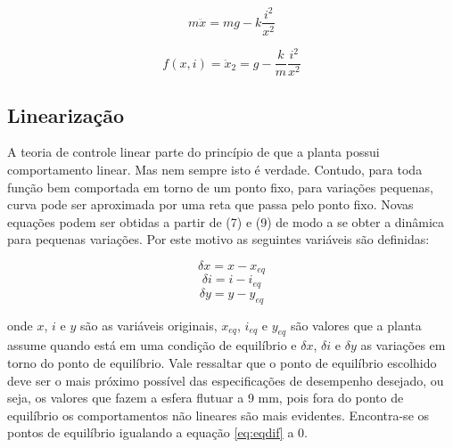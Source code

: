 \documentclass{ifacconf}
\begin{document}
\begin{equation}
    m\ddot{x} = mg - k \frac{i^2}{x^2}
\end{equation}

\begin{equation}
    f(x,i) = \ddot{x}_2 = g - \frac{k}{m} \frac{i^2}{x^2}
    \label{eq:eqdif}
\end{equation}

\subsection{Linearização}

A teoria de controle linear parte do princípio de que a planta
possui comportamento linear. Mas nem sempre isto é
verdade. Contudo, para toda função bem comportada em torno de
um ponto fixo, para variações pequenas, curva pode ser aproximada por uma reta que passa pelo ponto fixo. Novas equações podem ser obtidas a partir de (7) e (9) de modo a se obter a dinâmica para pequenas variações. Por este motivo as seguintes variáveis são definidas:

\begin{equation}
    \delta x = x - x_{eq}
\end{equation}
\begin{equation}
    \delta i = i - i_{eq}
\end{equation}
\begin{equation}
    \delta y = y - y_{eq}
\end{equation}

\noindent onde $x$, $i$ e $y$ são as variáveis originais, $x_{eq}$, $i_{eq}$ e $y_{eq}$ são valores que a planta assume quando está em uma condição de equilíbrio e $\delta x$, $\delta i$ e $\delta y$ as variações em torno do ponto de equilíbrio. Vale ressaltar que o ponto de equilíbrio escolhido deve ser o mais próximo possível das especificações de desempenho desejado, ou seja, os valores que fazem a esfera flutuar a 9 mm, pois fora do ponto de equilíbrio os comportamentos não lineares são mais evidentes. Encontra-se os pontos de equilíbrio igualando a equação \ref{eq:eqdif} a 0.
\end{document}

